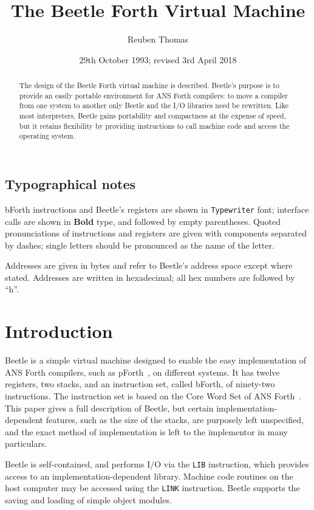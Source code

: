 \documentclass[english]{article}
\title{The Beetle Forth Virtual Machine}
\author{Reuben Thomas}
\date{29th October 1993; revised 3rd April 2018}
\newlength{\pronunc}\pronunc=1.7in
\begin{document}
\maketitle

\begin{abstract}
\noindent The design of the Beetle Forth virtual machine is described.
Beetle's purpose is to provide an easily portable environment for ANS Forth
compilers: to move a compiler from one system to another only Beetle and the I/O
libraries need be rewritten. Like most interpreters, Beetle gains portability
and compactness at the expense of speed, but it retains flexibility by providing
instructions to call machine code and access the operating system.
\end{abstract}


\subsection*{Typographical notes}

bForth instructions and Beetle's registers are shown in {\tt Typewriter} font;
interface calls are shown in {\bf Bold} type, and followed by empty parentheses.
Quoted pronunciations of instructions and registers are given with components
separated by dashes; single letters should be pronounced as the name of the
letter.

Addresses are given in bytes and refer to Beetle's address space except where
stated. Addresses are written in hexadecimal; all hex numbers are followed by
``h''.


\section{Introduction}

Beetle is a simple virtual machine designed to enable the easy implementation
of ANS Forth compilers, such as pForth~\cite{beetledis}, on different systems.
It has twelve registers, two stacks, and an instruction set, called bForth, of
ninety-two instructions. The instruction set is based on the Core Word Set of
ANS Forth~\cite{ANSIforth}. This paper gives a full description of Beetle, but
certain implementation-dependent features, such as the size of the stacks, are
purposely left unspecified, and the exact method of implementation is left to
the implementor in many particulars.

Beetle is self-contained, and performs I/O via the {\tt LIB} instruction, which
provides access to an implementation-dependent library. Machine
code routines on the host computer may be accessed using the {\tt LINK}
instruction. Beetle supports the saving and loading of simple object modules.
\end{document}
